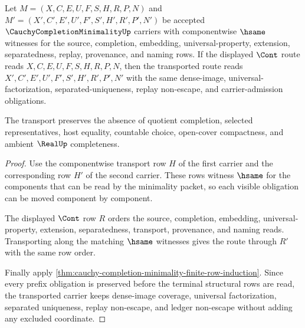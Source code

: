 \begin{theorem}
\label{thm:cauchy-completion-minimality-transport-stability}
Let $M=(X,C,E,U,F,S,H,R,P,N)$ and $M'=(X',C',E',U',F',S',H',R',P',N')$ be accepted $\CauchyCompletionMinimalityUp$ carriers with componentwise $\hsame$ witnesses for the source, completion, embedding, universal-property, extension, separatedness, replay, provenance, and naming rows. If the displayed $\Cont$ route reads $X,C,E,U,F,S,H,R,P,N$, then the transported route reads $X',C',E',U',F',S',H',R',P',N'$ with the same dense-image, universal-factorization, separated-uniqueness, replay non-escape, and carrier-admission obligations.

The transport preserves the absence of quotient completion, selected representatives, host equality, countable choice, open-cover compactness, and ambient $\RealUp$ completeness.
\end{theorem}
\begin{proof}
Use the componentwise transport row $H$ of the first carrier and the corresponding row $H'$ of the second carrier. These rows witness $\hsame$ for the components that can be read by the minimality packet, so each visible obligation can be moved component by component.

The displayed $\Cont$ row $R$ orders the source, completion, embedding, universal-property, extension, separatedness, transport, provenance, and naming reads. Transporting along the matching $\hsame$ witnesses gives the route through $R'$ with the same row order.

Finally apply \autoref{thm:cauchy-completion-minimality-finite-row-induction}. Since every prefix obligation is preserved before the terminal structural rows are read, the transported carrier keeps dense-image coverage, universal factorization, separated uniqueness, replay non-escape, and ledger non-escape without adding any excluded coordinate.
\end{proof}

